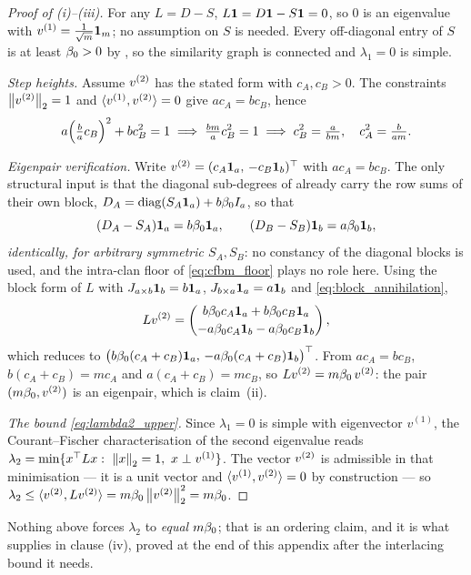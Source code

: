 \begin{proof}[Proof of (i)--(iii)]
For any $L=D-S$, $L\mathbf{1}=D\mathbf{1}-S\mathbf{1}=0$, so $0$ is an eigenvalue with
$v^{(1)}=\tfrac1{\sqrt m}\mathbf{1}_m$; no assumption on $S$ is needed. Every off-diagonal
entry of $S$ is at least $\beta_0>0$ by , so the similarity graph is
connected and $\lambda_1=0$ is simple.

\emph{Step heights.} Assume $v^{(2)}$ has the stated form with $c_A,c_B>0$. The
constraints $\left\lVert v^{(2)} \right\rVert_2=1$ and $\langle v^{(1)},v^{(2)}\rangle=0$ give $ac_A=bc_B$,
hence
\[
   a\Bigl(\tfrac{b}{a}c_B\Bigr)^2+bc_B^2=1
   \;\Longrightarrow\;\tfrac{bm}{a}c_B^2=1
   \;\Longrightarrow\; c_B^2=\tfrac{a}{bm},\quad c_A^2=\tfrac{b}{am}.
\]

\emph{Eigenpair verification.} Write $v^{(2)}=(c_A\mathbf{1}_a,\,-c_B\mathbf{1}_b)^\top$ with
$ac_A=bc_B$. The only structural input is that the diagonal sub-degrees of
 already carry the row sums of their own block,
$D_A=\operatorname{diag}(S_A\mathbf{1}_a)+b\beta_0 I_a$, so that
\begin{equation}\label{eq:block_annihilation}
   (D_A-S_A)\mathbf{1}_a=b\beta_0\mathbf{1}_a,\qquad(D_B-S_B)\mathbf{1}_b=a\beta_0\mathbf{1}_b,
\end{equation}
\emph{identically, for arbitrary symmetric $S_A,S_B$}: no constancy of the diagonal
blocks is used, and the intra-clan floor of \eqref{eq:cfbm_floor} plays no role here.
Using the block form of $L$ with $J_{a\times b}\mathbf{1}_b=b\mathbf{1}_a$,
$J_{b\times a}\mathbf{1}_a=a\mathbf{1}_b$ and \eqref{eq:block_annihilation},
\[
   Lv^{(2)}=
   \begin{pmatrix}
     b\beta_0 c_A\mathbf{1}_a+b\beta_0 c_B\mathbf{1}_a\\[2pt]
     -a\beta_0 c_A\mathbf{1}_b-a\beta_0 c_B\mathbf{1}_b
   \end{pmatrix},
\]
which reduces to
$\bigl(b\beta_0(c_A+c_B)\mathbf{1}_a,\,-a\beta_0(c_A+c_B)\mathbf{1}_b\bigr)^\top$. From $ac_A=bc_B$,
$b(c_A+c_B)=mc_A$ and $a(c_A+c_B)=mc_B$, so $Lv^{(2)}=m\beta_0\,v^{(2)}$: the pair
$(m\beta_0,v^{(2)})$ is an eigenpair, which is claim~(ii).

\emph{The bound \eqref{eq:lambda2_upper}.} Since $\lambda_1=0$ is simple with
eigenvector $v^{(1)}$, the Courant--Fischer characterisation of the second
eigenvalue reads $\lambda_2=\min\{x^\top Lx:\ \norm{x}_2=1,\ x\perp v^{(1)}\}$. The
vector $v^{(2)}$ is admissible in that minimisation --- it is a unit vector and
$\langle v^{(1)},v^{(2)}\rangle=0$ by construction --- so
$\lambda_2\le\langle v^{(2)},Lv^{(2)}\rangle=m\beta_0\left\lVert v^{(2)} \right\rVert_2^2=m\beta_0$.
\end{proof}

\noindent Nothing above forces $\lambda_2$ to \emph{equal} $m\beta_0$; that is an
ordering claim, and it is what  supplies in clause (iv), proved at
the end of this appendix after the interlacing bound it needs.

